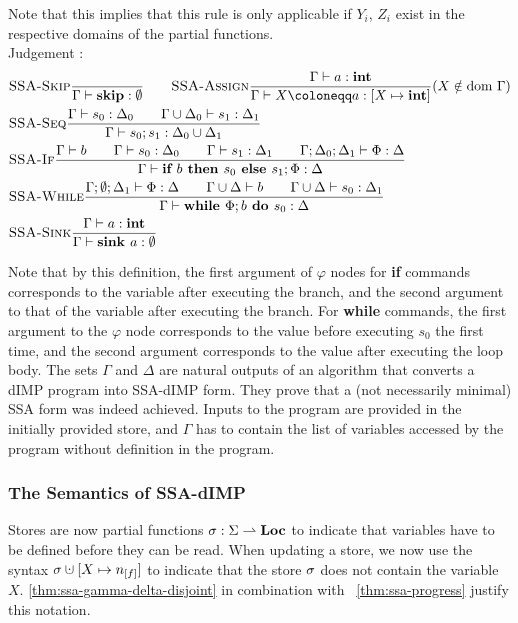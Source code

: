 Note that this implies that this rule is only applicable if $Y_i$, $Z_i$ exist in the respective domains
of the partial functions.
\\
Judgement :
\begin{align*}
    &\trule{SSA-Skip}{}{\typestep{\Gamma}{\skipcmd}{\emptyset}}\qquad
    \trule{SSA-Assign}{\typestep{\Gamma}{a}{\tint}}{\typestep{\Gamma}{\defaultstore}{[X \mapsto \tint]}} \text{($X \notin \dom\Gamma$)}\\
    &\trule{SSA-Seq}{\typestep{\Gamma}{s_0}{\Delta_0}\qquad
    \typestep{\Gamma \cup \Delta_0}{s_1}{\Delta_1}}{\typestep{\Gamma}{\defaultssaseq}{\Delta_0 \cup \Delta_1}}\\
    &\trule{SSA-If}{\typestmt{\Gamma}{b}\qquad\typestep{\Gamma}{s_0}{\Delta_0}\qquad \typestep{\Gamma}{s_1}{\Delta_1}\qquad
    \typestep{\Gamma;\Delta_0;\Delta_1}{\philist}{\Delta}}
    {\typestep{\Gamma}{\defaultssaif}{\Delta}}\\
    &\trule{SSA-While}{\typestep{\Gamma;\emptyset;\Delta_1}{\philist}{\Delta}\qquad
    \typestmt{\Gamma \cup \Delta}{b}\qquad\typestep{\Gamma \cup \Delta}{s_0}{\Delta_1}}
    {\typestep{\Gamma}{\defaultssawhile}{\Delta}}\\
    &\trule{SSA-Sink}{\typestep{\Gamma}{a}{\tint}}{\typestep{\Gamma}{\sink{a}}{\emptyset}}\\
\end{align*}

Note that by this definition, the first argument of $\varphi$ nodes for \textbf{if} commands
corresponds to the variable after executing the \btrue{} branch, and the second argument to that
of the variable after executing the \bfalse{} branch.
For \textbf{while} commands, the first argument to the $\varphi$ node corresponds to the value
before executing $s_0$ the first time, and the second argument corresponds to the value 
after executing the loop body.
The sets $\Gamma$ and $\Delta$ are natural outputs of an algorithm that converts a 
dIMP program into SSA-dIMP form.
They prove that a (not necessarily minimal) SSA form was indeed achieved.
Inputs to the program are provided in the initially provided store, and $\Gamma$
has to contain the list of variables accessed by the program without definition in the program.

\subsubsection*{The Semantics of SSA-dIMP}
Stores are now partial functions $\sigma : \Sigma \rightharpoonup \textbf{Loc}$ to indicate that
variables have to be defined before they can be read.
When updating a store, we now use the syntax 
$\store \dunion [X \mapsto \flagged{}]$ to indicate that the store $\sigma$ does not
contain the variable $X$.
\autoref{thm:ssa-gamma-delta-disjoint} in combination with ~\autoref{thm:ssa-progress}
justify this notation.


